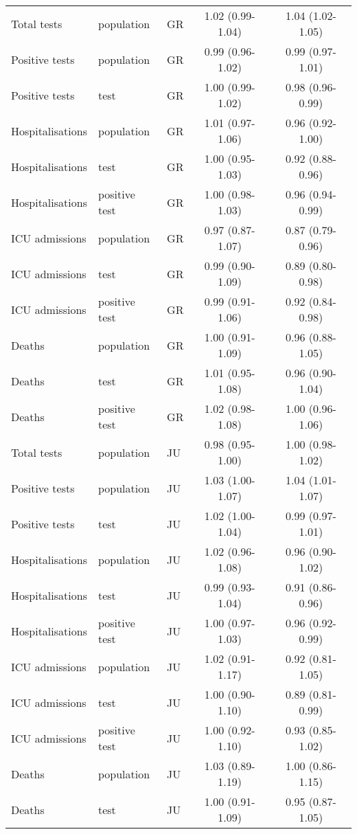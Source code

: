 \documentclass{article}
\begin{document}
\begin{longtable}{lllcc}
		Total tests & population & GR & 1.02 (0.99-1.04) & 1.04 (1.02-1.05) \\ 
		Positive tests & population & GR & 0.99 (0.96-1.02) & 0.99 (0.97-1.01) \\ 
		Positive tests & test & GR & 1.00 (0.99-1.02) & 0.98 (0.96-0.99) \\ 
		Hospitalisations & population & GR & 1.01 (0.97-1.06) & 0.96 (0.92-1.00) \\ 
		Hospitalisations & test & GR & 1.00 (0.95-1.03) & 0.92 (0.88-0.96) \\ 
		Hospitalisations & positive test & GR & 1.00 (0.98-1.03) & 0.96 (0.94-0.99) \\ 
		ICU admissions & population & GR & 0.97 (0.87-1.07) & 0.87 (0.79-0.96) \\ 
		ICU admissions & test & GR & 0.99 (0.90-1.09) & 0.89 (0.80-0.98) \\ 
		ICU admissions & positive test & GR & 0.99 (0.91-1.06) & 0.92 (0.84-0.98) \\ 
		Deaths & population & GR & 1.00 (0.91-1.09) & 0.96 (0.88-1.05) \\ 
		Deaths & test & GR & 1.01 (0.95-1.08) & 0.96 (0.90-1.04) \\ 
		Deaths & positive test & GR & 1.02 (0.98-1.08) & 1.00 (0.96-1.06) \\ 
		Total tests & population & JU & 0.98 (0.95-1.00) & 1.00 (0.98-1.02) \\ 
		Positive tests & population & JU & 1.03 (1.00-1.07) & 1.04 (1.01-1.07) \\ 
		Positive tests & test & JU & 1.02 (1.00-1.04) & 0.99 (0.97-1.01) \\ 
		Hospitalisations & population & JU & 1.02 (0.96-1.08) & 0.96 (0.90-1.02) \\ 
		Hospitalisations & test & JU & 0.99 (0.93-1.04) & 0.91 (0.86-0.96) \\ 
		Hospitalisations & positive test & JU & 1.00 (0.97-1.03) & 0.96 (0.92-0.99) \\ 
		ICU admissions & population & JU & 1.02 (0.91-1.17) & 0.92 (0.81-1.05) \\ 
		ICU admissions & test & JU & 1.00 (0.90-1.10) & 0.89 (0.81-0.99) \\ 
		ICU admissions & positive test & JU & 1.00 (0.92-1.10) & 0.93 (0.85-1.02) \\ 
		Deaths & population & JU & 1.03 (0.89-1.19) & 1.00 (0.86-1.15) \\ 
		Deaths & test & JU & 1.00 (0.91-1.09) & 0.95 (0.87-1.05) \\ 

\end{longtable}
\end{document}
